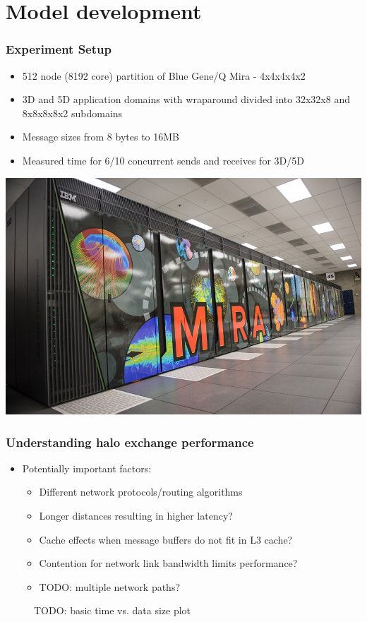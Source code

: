 \documentclass{beamer}
\begin{document}
\section{Model development}
\begin{frame}
\frametitle{Experiment Setup}
\begin{itemize}
  \item 512 node (8192 core) partition of Blue Gene/Q Mira - 4x4x4x4x2
  \item 3D and 5D application domains with wraparound
        divided into 32x32x8 and 8x8x8x8x2 subdomains
  \item Message sizes from 8 bytes to 16MB
  \item Measured time for 6/10 concurrent sends and receives for 3D/5D
\end{itemize}

\centering
\includegraphics[width=0.45\linewidth]{mira}

\end{frame}

\begin{frame}
\frametitle{Understanding halo exchange performance}
\begin{itemize}
  \item Potentially important factors:
  \begin{itemize}
    \item Different network protocols/routing algorithms
    \item Longer distances resulting in higher latency?
    \item Cache effects when message buffers do not fit in L3 cache?
    \item Contention for network link bandwidth limits performance?
    \item TODO: multiple network paths?
  \end{itemize}
\end{itemize}

\begin{figure}
TODO: basic time vs. data size plot
\end{figure}
\end{frame}
\end{document}
